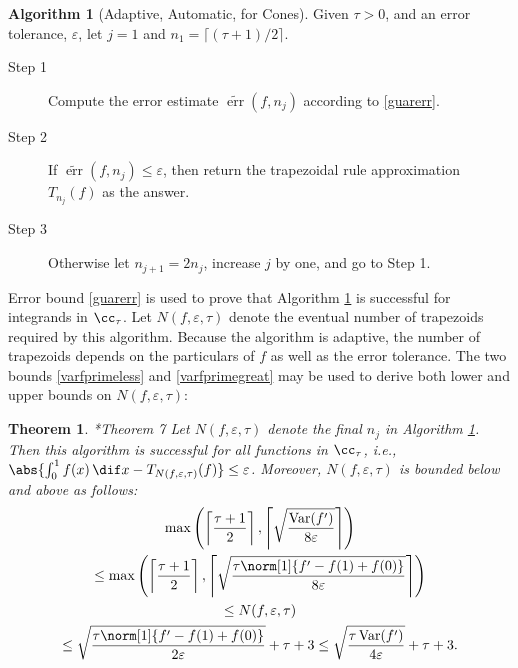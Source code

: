 \documentclass[]{article}
\DeclareMathOperator{\Var}{Var}
\DeclareMathOperator{\err}{err}
\newcommand{\terr}{\widetilde{\err}}
\newtheorem{theorem}{Theorem}
\theoremstyle{definition}
\newtheorem{algo}{Algorithm}
\theoremstyle{remark}
\begin{document}
\begin{algo}[Adaptive, Automatic, for Cones] \label{conealgo} Given $\tau>0$, and an error tolerance, $\varepsilon$, let $j=1$ and $n_1=\lceil (\tau+1)/2 \rceil$.

\begin{description} 

\item[Step 1] Compute the error estimate $\terr(f,n_j)$ according to \eqref{guarerr}.

\item [Step 2] If $\terr(f,n_j) \le \varepsilon$, then return the trapezoidal rule approximation $T_{n_j}(f)$ as the answer.  

\item [Step 3] Otherwise let $n_{j+1}=2 n_j$, increase $j$ by one, and go to Step 1.

\end{description}
\end{algo}

Error bound \eqref{guarerr} is used to prove that Algorithm \ref{conealgo} is successful for integrands in $\cc_{\tau}$.  Let $N(f,\varepsilon,\tau)$ denote the eventual number of trapezoids required by this algorithm.  Because the algorithm is adaptive, the number of trapezoids depends on the particulars of $f$ as well as the error tolerance.  The two bounds \eqref{varfprimeless} and \eqref{varfprimegreat} may be used to derive both lower and upper bounds on $N(f,\varepsilon,\tau)$:

\begin{theorem}\cite{HicEtal14b}*{Theorem 7} \label{conealgothm}
Let $N(f,\varepsilon,\tau)$ denote the final $n_j$ in Algorithm \ref{conealgo}.  Then this algorithm is successful for all functions in $\cc_{\tau}$,  i.e.,  $\abs{\int_0^1 f(x) \, \dif x - T_{N(f,\varepsilon,\tau)}(f)} \le \varepsilon$.  Moreover, $N(f,\varepsilon,\tau)$ is bounded below and above as follows:
\begin{multline}
\max \left(\left \lceil\frac{\tau+1}{2} \right \rceil, \left \lceil \sqrt{\frac{ \Var(f')}{8\varepsilon}} \right \rceil \right) \\
\le \max \left(\left \lceil\frac{\tau+1}{2} \right \rceil, \left \lceil \sqrt{\frac{\tau \norm[1]{f'-f(1)+f(0)}}{8\varepsilon}} \right \rceil \right) \\
\le
N(f,\varepsilon,\tau) \\
\le \sqrt{\frac{\tau \norm[1]{f'-f(1)+f(0)}}{2\varepsilon}} + \tau + 3
\le \sqrt{\frac{\tau \Var(f') }{4\varepsilon}} + \tau + 3.
\end{multline}
\end{theorem}
\end{document}
